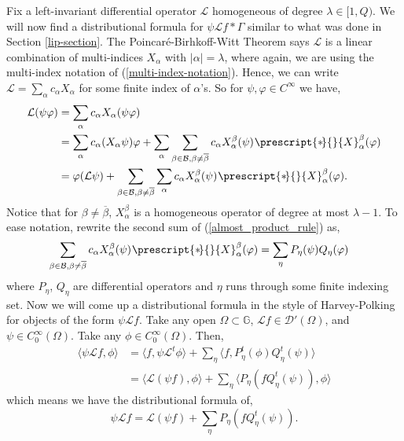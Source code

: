 \documentclass[12pt,a4paper,reqno]{amsart}
\newcommand{\cg}{\Gamma}
\renewcommand{\L}{\mathcal{L}}
\renewcommand{\l}{\lambda}
\newcommand{\D}{\mathcal{D}}
\renewcommand{\a}{\alpha}
\newcommand{\G}{\mathbb{G}}
\numberwithin{equation}{section}
\theoremstyle{definition}
\renewcommand*{\star}[2][-3mu]{\ensuremath{\mskip1mu\prescript{\smash{\mathrm *\mkern#1}}{}{\mathstrut#2}}}
\begin{document}
 Fix a left-invariant differential operator $\L$ homogeneous of degree $\l \in [1, Q)$. We will now find a distributional formula for $\psi \L f \ast \cg$ similar to what was done in Section \ref{lip-section}. The Poincar\'{e}-Birhkoff-Witt Theorem says $\L$ is a linear combination of multi-indices $X_{\a}$ with $| \a| = \l$, where again, we are using the multi-index notation of (\ref{multi-index-notation}). Hence, we can write $\L = \sum_{\a} c_{\a}X_{\a}$ for some finite index of $\a$'s. So for $\psi ,\varphi \in C^{\infty}$ we have, \begin{align}
\L (\psi \varphi) &= \sum_{\a} c_{\a} X_{\a} (\psi \varphi) \nonumber \\ &= \sum_{\a} c_{\a} (X_{\a} \psi )\varphi + \sum_{\a} \sum_{\beta \in \mathcal{B}, \beta \neq \overline{\beta}} c_{\a} X_{\a}^{\beta}(\psi) \star{X}_{\a}^{\beta}(\varphi) \nonumber \\ &= \varphi (\L \psi) + \sum_{\beta \in \mathcal{B}, \beta \neq \overline{\beta}} \sum_{\a} c_{\a} X_{\a}^{\beta}(\psi) \star{X}_{\a}^{\beta}(\varphi). \label{almost_product_rule}
\end{align}
Notice that for $\beta \neq \overline{\beta}$, $X_{\a}^{\beta}$ is a homogeneous operator of degree at most $\l-1$. To ease notation, rewrite the second sum of (\ref{almost_product_rule}) as, \begin{align*}
\sum_{\beta \in \mathcal{B}, \beta \neq \overline{\beta}} c_{\a} X_{\a}^{\beta}(\psi) \star{X}_{\a}^{\beta}(\varphi) &= \sum_{\eta} P_{\eta}(\psi) Q_{\eta}(\varphi)
\end{align*}
where $P_{\eta}$, $Q_{\eta}$ are differential operators and $\eta$ runs through some finite indexing set. Now we will come up a distributional formula in the style of Harvey-Polking for objects of the form $\psi\L f$. Take any open $\Omega \subset \G$, $\L f \in \D'(\Omega)$, and $\psi \in C_0^{\infty}(\Omega)$. Take any $\phi \in C_0^{\infty}(\Omega)$. Then, \begin{align*}
    \langle \psi \L f, \phi \rangle &= \langle f, \psi \L^t \phi \rangle + \sum_{\eta} \langle f, P_{\eta}^t(\phi) Q_{\eta}^t(\psi)\rangle \\ &= \langle \L (\psi f) , \phi \rangle + \sum_{\eta} \langle P_{\eta}(f Q_{\eta}^t(\psi)), \phi \rangle
\end{align*}
which means we have the distributional formula of,
\begin{equation}\label{distributional_product_formula}
 \psi \L f = \L (\psi f) + \sum_{\eta} P_{\eta}(f Q_{\eta}^t(\psi)).   
\end{equation}
\end{document}

